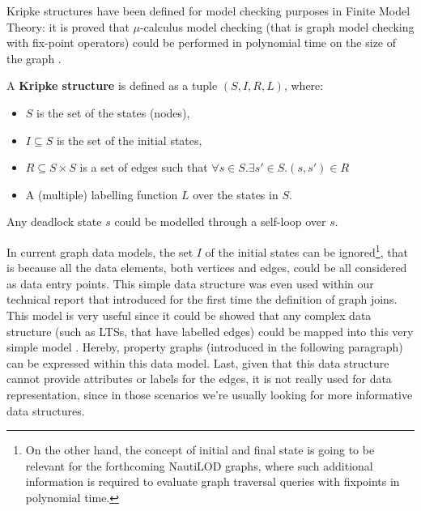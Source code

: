 Kripke structures have been defined for model checking purposes in Finite Model Theory:
it is proved that $\mu$-calculus model checking (that is graph model checking with fix-point
operators) could be performed in polynomial time on the size of the graph \cite{GradelBook}. 

\begin{definition}\label{def:kripke}
	A \textbf{Kripke structure} \cite{Kri63} is defined as a tuple $(S,I,R,L)$, where:
	\begin{itemize}
		\item $S$ is the set of the states (nodes),
		\item $I\subseteq S$ is the set of the initial states,
		\item $R\subseteq S\times S$ is a set of edges such that $\forall s\in S. \exists s'\in S. (s,s')\in R$
		\item A (multiple) labelling function $L$ over the states in $S$.
	\end{itemize}
	Any deadlock state $s$ could be modelled through a self-loop over $s$.
\end{definition}

In current graph data models, the set $I$ of the initial states can be ignored\footnote{On the other hand, the concept of initial and final state is going to be relevant for the forthcoming NautiLOD graphs, where such additional information is required to evaluate graph traversal queries with fixpoints in polynomial time.}, that is because all the data elements, both vertices and edges, could be all considered as data entry points. This simple data structure was even used within our technical report \cite{BergamiMM16} that introduced for the first time the definition of graph joins. This
model is very useful since it could be showed that any complex data structure (such as LTSs,
that have labelled edges) could be mapped into this very
simple model \cite{Nicola1990}. Hereby, property graphs (introduced in the following paragraph) can be expressed within this data model. Last, given that this data structure cannot provide attributes or labels for the edges, it is not really used for data representation, since in those scenarios we're usually looking for more informative data structures.